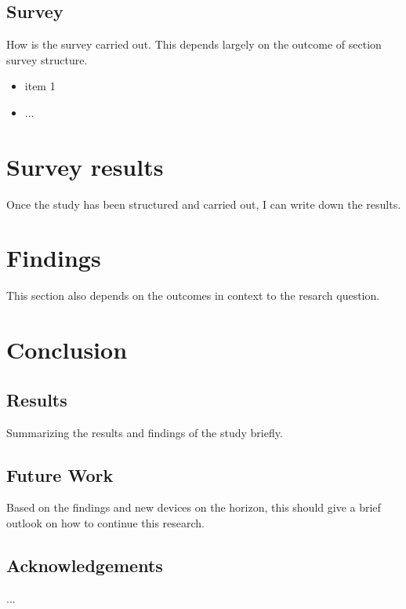 \documentclass[titlepage, a4paper, 11pt]{scrartcl}
\begin{document}
        \subsection{Survey}

            How is the survey carried out. This depends largely on the outcome of section survey structure.

            \begin{itemize}
                \item item 1
                \item ...
            \end{itemize}

    \section{Survey results}

        Once the study has been structured and carried out, I can write down the results.

    \section{Findings}

        This section also depends on the outcomes in context to the resarch question.

    \section{Conclusion}

        \subsection{Results}

            Summarizing the results and findings of the study briefly.

        \subsection{Future Work}

            Based on the findings and new devices on the horizon, this should give a brief outlook on how to continue this research.

        \subsection{Acknowledgements}

            ...

     
    
\end{document}
